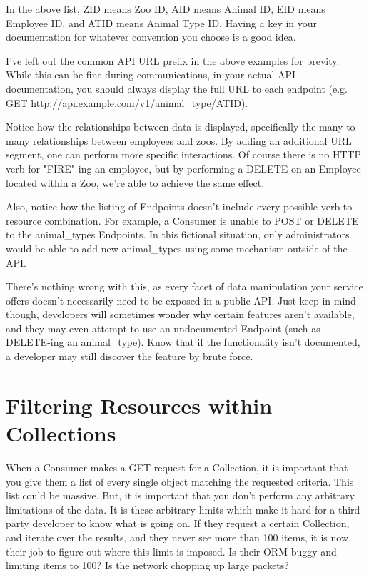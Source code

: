 \documentclass{book}
\begin{document}
In the above list, ZID means Zoo ID, AID means Animal ID, EID means Employee ID, and ATID means Animal Type ID. Having a key in your documentation for whatever convention you choose is a good idea.

I've left out the common API URL prefix in the above examples for brevity. While this can be fine during communications, in your actual API documentation, you should always display the full URL to each endpoint (e.g. GET http://api.example.com/v1/animal\_type/ATID).

Notice how the relationships between data is displayed, specifically the many to many relationships between employees and zoos. By adding an additional URL segment, one can perform more specific interactions. Of course there is no HTTP verb for "FIRE"-ing an employee, but by performing a DELETE on an Employee located within a Zoo, we're able to achieve the same effect.

Also, notice how the listing of Endpoints doesn't include every possible verb-to-resource combination. For example, a Consumer is unable to POST or DELETE to the animal\_types Endpoints. In this fictional situation, only administrators would be able to add new animal\_types using some mechanism outside of the API.

There's nothing wrong with this, as every facet of data manipulation your service offers doesn't necessarily need to be exposed in a public API. Just keep in mind though, developers will sometimes wonder why certain features aren't available, and they may even attempt to use an undocumented Endpoint (such as DELETE-ing an animal\_type). Know that if the functionality isn't documented, a developer may still discover the feature by brute force.


\section{Filtering Resources within Collections}

When a Consumer makes a GET request for a Collection, it is important that you give them a list of every single object matching the requested criteria. This list could be massive. But, it is important that you don't perform any arbitrary limitations of the data. It is these arbitrary limits which make it hard for a third party developer to know what is going on. If they request a certain Collection, and iterate over the results, and they never see more than 100 items, it is now their job to figure out where this limit is imposed. Is their ORM buggy and limiting items to 100? Is the network chopping up large packets?
\end{document}
